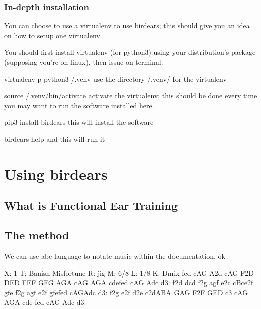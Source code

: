 \documentclass[letterpaper,10pt,english]{sphinxmanual}
\begin{document}
\subsection{In-depth installation}
\label{\detokenize{index:in-depth-installation}}
You can choose to use a virtualenv to use birdears; this should give you
an idea on how to setup one virtualenv.

You should first install virtualenv (for python3) using your
distribution’s package (supposing you’re on linux), then issue on terminal:

\begin{sphinxVerbatim}[commandchars=\\\{\}]
virtualenv \PYGZhy{}p python3 \PYGZti{}/.venv \PYGZsh{} use the directory \PYGZti{}/.venv/ for the virtualenv

source \PYGZti{}/.venv/bin/activate   \PYGZsh{} activate the virtualenv; this should be done
                              \PYGZsh{} every time you may want to run the software
                              \PYGZsh{} installed here.

pip3 install birdears         \PYGZsh{} this will install the software

birdears \PYGZhy{}\PYGZhy{}help               \PYGZsh{} and this will run it
\end{sphinxVerbatim}


\chapter{Using birdears}
\label{\detokenize{index:using-birdears}}

\section{What is Functional Ear Training}
\label{\detokenize{index:what-is-functional-ear-training}}


\section{The method}
\label{\detokenize{index:the-method}}
We can use abc language to notate music within the documentation, ok

\begin{sphinxVerbatim}[commandchars=\\\{\}]
X: 1
T: Banish Misfortune
R: jig
M: 6/8
L: 1/8
K: Dmix
fed cAG\textbar{} A2d cAG\textbar{} F2D DED\textbar{} FEF GFG\textbar{}
AGA cAG\textbar{} AGA cde\textbar{}fed cAG\textbar{} Ad\PYGZca{}c d3:\textbar{}
f2d d\PYGZca{}cd\textbar{} f2g agf\textbar{} e2c cBc\textbar{}e2f gfe\textbar{}
f2g agf\textbar{} e2f gfe\textbar{}fed cAG\textbar{}Ad\PYGZca{}c d3:\textbar{}
f2g e2f\textbar{} d2e c2d\textbar{}ABA GAG\textbar{} F2F GED\textbar{}
c3 cAG\textbar{} AGA cde\textbar{} fed cAG\textbar{} Ad\PYGZca{}c d3:\textbar{}
\end{sphinxVerbatim}
\end{document}

